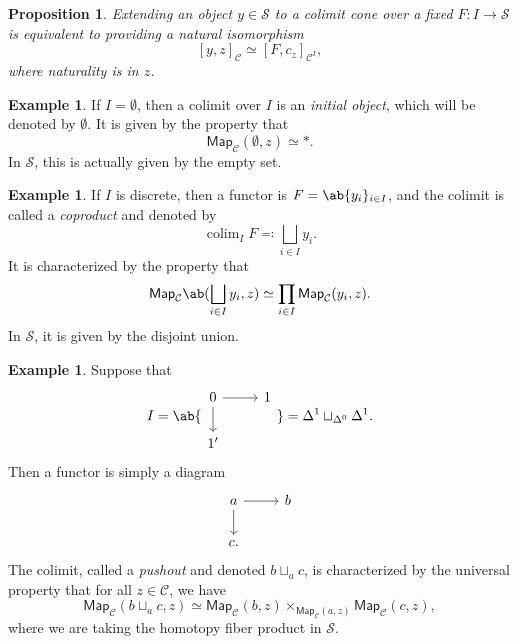 \documentclass[10pt, oneside]{memoir}
\newtheorem{prop}[thm]{Proposition}
\theoremstyle{definition}
\newtheorem{exm}[thm]{Example}
\theoremstyle{remark}
\theoremstyle{plain}
\theoremstyle{definition}
\theoremstyle{remark}
\newcommand{\mc}[1]{\mathcal{#1}}
\newcommand{\ms}[1]{\mathsf{#1}}
\newcommand{\1}{\mathbf{1}}
\newcommand{\2}{\mathbf{2}}
\newcommand{\3}{\mathbf{3}}
\DeclareMathOperator*{\colim}{colim}
\begin{document}
\begin{prop}
    Extending an object $y \in \mc{S}$ to a colimit cone over a fixed $F \colon I \to \mc{S}$ is equivalent to providing a natural isomorphism
    \[ [y, z]_{\mc{C}} \simeq [F, c_z]_{\mc{C}^I}, \]
    where naturality is in $z$.
\end{prop}

\begin{exm}
    If $I = \emptyset$, then a colimit over $I$ is an \textit{initial object}, which will be denoted by $\emptyset$. It is given by the property that
    \[ \ms{Map}_{\mc{C}}(\emptyset, z) \simeq *. \]
    In $\mc{S}$, this is actually given by the empty set.
\end{exm}

\begin{exm}
    If $I$ is discrete, then a functor is $F = \ab\{y_i \}_{i \in I}$, and the colimit is called a \textit{coproduct} and denoted by
    \[ \colim_I F \eqqcolon \bigsqcup_{i \in I} y_i. \]
    It is characterized by the property that
    \[ \ms{Map}_{\mc{C}}\ab(\bigsqcup_{i\in I} y_i, z) \simeq \prod_{i \in I} \ms{Map}_{\mc{C}}(y_i, z). \]
    In $\mc{S}$, it is given by the disjoint union.
\end{exm}

\begin{exm}
    Suppose that
    \begin{equation*}I = \ab\{
    \begin{tikzcd}[ampersand replacement=\&]
        0 \ar{r} \ar{d} \& 1 \\
        1' 
    \end{tikzcd} \} = \Delta^1 \sqcup_{\Delta^0} \Delta^1.
    \end{equation*}
    Then a functor is simply a diagram
    \begin{equation*}
    \begin{tikzcd}
        a \ar{r} \ar{d} & b \\
        c.
    \end{tikzcd}
    \end{equation*}
    The colimit, called a \textit{pushout} and denoted $b \sqcup_a c$, is characterized by the universal property that for all $z \in \mc{C}$, we have
    \[ \ms{Map}_{\mc{C}}(b \sqcup_a c, z) \simeq \ms{Map}_{\mc{C}}(b, z) \times_{\ms{Map}_{\mc{C}}(a, z)} \ms{Map}_{\mc{C}}(c, z), \]
    where we are taking the homotopy fiber product in $\mc{S}$.
\end{exm}
\end{document}

